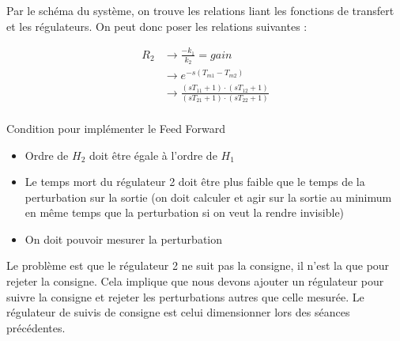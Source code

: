 Par le schéma du système, on trouve les relations liant les fonctions de transfert et les régulateurs. On peut donc poser les relations suivantes :

\begin{align}
R_{2} &\rightarrow \frac{-k_{1}}{k_{2}} = gain\\
	  &\rightarrow e^{-s(T_{m1} - T_{m2})}\\
	  &\rightarrow \frac{(sT_{11} + 1) \cdot (sT_{12} + 1)}{(sT_{21} + 1) \cdot (sT_{22} + 1)}\\
\end{align}

Condition pour implémenter le Feed Forward
\begin{itemize}
\item Ordre de $H_{2}$ doit être égale à l'ordre de $H_{1}$
\item Le temps mort du régulateur 2 doit être plus faible que le temps de la perturbation sur la sortie (on doit calculer et agir sur la sortie au minimum en même temps que la perturbation si on veut la rendre invisible)
\item On doit pouvoir mesurer la perturbation
\end{itemize}

Le problème est que le régulateur 2 ne suit pas la consigne, il n'est la que pour rejeter la consigne. Cela implique que nous devons ajouter un régulateur pour suivre la consigne et rejeter les perturbations autres que celle mesurée. Le régulateur de suivis de consigne est celui dimensionner lors des séances précédentes. 
